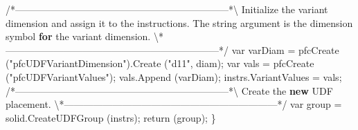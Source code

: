 \documentclass[]{article}
\newenvironment{Shaded}{}{}
\newcommand{\KeywordTok}[1]{\textcolor[rgb]{0.00,0.44,0.13}{\textbf{{#1}}}}
\newcommand{\FloatTok}[1]{\textcolor[rgb]{0.25,0.63,0.44}{{#1}}}
\newcommand{\OtherTok}[1]{\textcolor[rgb]{0.00,0.44,0.13}{{#1}}}
\newcommand{\NormalTok}[1]{{#1}}
\begin{document}
\begin{Shaded}
\begin{Highlighting}[]
\OtherTok{/}\NormalTok{*------------------------------------------------------------------*\textbackslash{}}
  \NormalTok{Initialize the variant dimension and assign it to the }\OtherTok{instructions}\NormalTok{.  }
  \NormalTok{The string argument is the dimension symbol }\KeywordTok{for} \NormalTok{the variant }
  \OtherTok{dimension}\NormalTok{.}
\NormalTok{\textbackslash{}*------------------------------------------------------------------*}\OtherTok{/  }
\OtherTok{   var varDiam = }
\OtherTok{     pfcCreate }\FloatTok{(}\OtherTok{"pfcUDFVariantDimension"}\FloatTok{)}\OtherTok{.Create }\FloatTok{(}\OtherTok{"d11", diam}\FloatTok{)}\OtherTok{;}
\OtherTok{   }
\OtherTok{   var vals = pfcCreate }\FloatTok{(}\OtherTok{"pfcUDFVariantValues"}\FloatTok{)}\OtherTok{;}
\OtherTok{   vals.Append }\FloatTok{(}\OtherTok{varDiam}\FloatTok{)}\OtherTok{;}
\OtherTok{   }
\OtherTok{   instrs.VariantValues = vals;}
\OtherTok{   }
\OtherTok{/}\NormalTok{*------------------------------------------------------------------*\textbackslash{}}
  \NormalTok{Create the }\KeywordTok{new} \NormalTok{UDF }\OtherTok{placement}\NormalTok{.}
\NormalTok{\textbackslash{}*------------------------------------------------------------------*}\OtherTok{/  }
\OtherTok{   var group = solid.CreateUDFGroup }\FloatTok{(}\OtherTok{instrs}\FloatTok{)}\OtherTok{;}
\OtherTok{    return }\FloatTok{(}\OtherTok{group}\FloatTok{)}\OtherTok{;}
\OtherTok{\}}
\end{Highlighting}
\end{Shaded}
\end{document}
